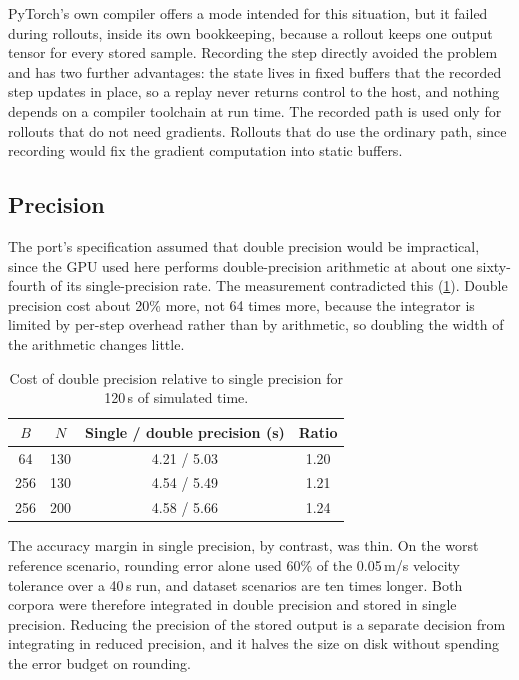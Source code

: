 PyTorch's own compiler offers a mode intended for this situation, but it failed during rollouts, inside its own bookkeeping, because a rollout keeps one output tensor for every stored sample. Recording the step directly avoided the problem and has two further advantages: the state lives in fixed buffers that the recorded step updates in place, so a replay never returns control to the host, and nothing depends on a compiler toolchain at run time. The recorded path is used only for rollouts that do not need gradients. Rollouts that do use the ordinary path, since recording would fix the gradient computation into static buffers.

\subsection{Precision}

The port's specification assumed that double precision would be impractical, since the GPU used here performs double-precision arithmetic at about one sixty-fourth of its single-precision rate. The measurement contradicted this (\cref{tab:gpu_precision}). Double precision cost about 20\% more, not 64 times more, because the integrator is limited by per-step overhead rather than by arithmetic, so doubling the width of the arithmetic changes little.

\begin{table}[htbp]
    \centering
    \begin{tabular}{cccc}
        \toprule
        $B$ & $N$ & Single / double precision (s) & Ratio \\
        \midrule
        64  & 130 & 4.21 / 5.03 & 1.20 \\
        256 & 130 & 4.54 / 5.49 & 1.21 \\
        256 & 200 & 4.58 / 5.66 & 1.24 \\
        \bottomrule
    \end{tabular}
    \caption{Cost of double precision relative to single precision for 120\,s of simulated time.}
    \label{tab:gpu_precision}
\end{table}

The accuracy margin in single precision, by contrast, was thin. On the worst reference scenario, rounding error alone used 60\% of the 0.05\,m/s velocity tolerance over a 40\,s run, and dataset scenarios are ten times longer. Both corpora were therefore integrated in double precision and stored in single precision. Reducing the precision of the stored output is a separate decision from integrating in reduced precision, and it halves the size on disk without spending the error budget on rounding.


